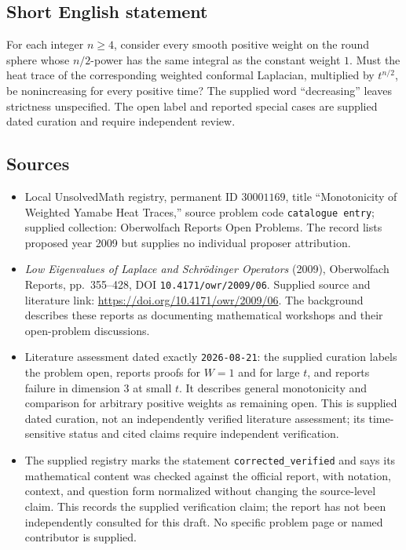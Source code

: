 \documentclass[11pt]{article}
\begin{document}
\subsection{Short English statement}
For each integer \(n\geq4\), consider every smooth positive weight on the round sphere whose \(n/2\)-power has the same integral as the constant weight \(1\). Must the heat trace of the corresponding weighted conformal Laplacian, multiplied by \(t^{n/2}\), be nonincreasing for every positive time? The supplied word ``decreasing'' leaves strictness unspecified. The open label and reported special cases are supplied dated curation and require independent review.
\subsection{Sources}
\begin{itemize}
\item Local UnsolvedMath registry, permanent ID \(30001169\), title ``Monotonicity of Weighted Yamabe Heat Traces,'' source problem code \texttt{catalogue entry}; supplied collection: Oberwolfach Reports Open Problems. The record lists proposed year 2009 but supplies no individual proposer attribution.
\item \emph{Low Eigenvalues of Laplace and Schr\"odinger Operators} (2009), Oberwolfach Reports, pp.~355--428, DOI \texttt{10.4171/owr/2009/06}. Supplied source and literature link: \url{https://doi.org/10.4171/owr/2009/06}. The background describes these reports as documenting mathematical workshops and their open-problem discussions.
\item Literature assessment dated exactly \texttt{2026-08-21}: the supplied curation labels the problem open, reports proofs for \(W=1\) and for large \(t\), and reports failure in dimension \(3\) at small \(t\). It describes general monotonicity and comparison for arbitrary positive weights as remaining open. This is supplied dated curation, not an independently verified literature assessment; its time-sensitive status and cited claims require independent verification.
\item The supplied registry marks the statement \texttt{corrected\_verified} and says its mathematical content was checked against the official report, with notation, context, and question form normalized without changing the source-level claim. This records the supplied verification claim; the report has not been independently consulted for this draft. No specific problem page or named contributor is supplied.
\end{itemize}
\end{document}
